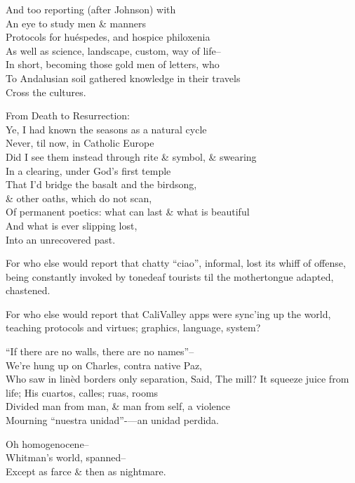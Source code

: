 And too reporting (after Johnson) with  \\
An eye to study men \& manners \\
Protocols for huéspedes, and hospice philoxenia \\
As well as science, landscape, custom, way of life-- \\
In short, becoming those gold men of letters, who \\
To Andalusian soil gathered knowledge in their travels \\
Cross the cultures.

From Death to Resurrection: \\
Ye, I had known the seasons as a natural cycle \\
Never, til now, in Catholic Europe \\
Did I see them instead through rite \& symbol, \& swearing \\
In a clearing, under God's first temple \\
That I'd bridge the basalt and the birdsong, \\
\& other oaths, which do not scan, \\
Of permanent poetics: what can last \& what is beautiful \\
And what is ever slipping lost, \\
Into an unrecovered past.

For who else would report that chatty ``ciao'', informal, lost its whiff of offense, being constantly invoked by tonedeaf tourists til the mothertongue adapted, chastened.

For who else would report that CaliValley apps were sync'ing up the world, teaching protocols and virtues; graphics, language, system?

``If there are no walls, there are no names''-- \\
We're hung up on Charles, contra native Paz, \\
Who saw in linèd borders only separation,
Said, The mill? It squeeze juice from life;
His cuartos, calles; ruas, rooms \\
Divided man from man, \& man from self, a violence \\
Mourning ``nuestra unidad''-—an unidad perdida.

Oh homogenocene-- \\
Whitman's world, spanned-- \\
Except as farce \& then as nightmare.

